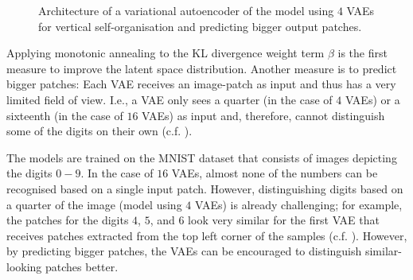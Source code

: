 \begin{figure}[h]
{
}
    \caption[Architecture of the VAEs predicting bigger output patches]{Architecture of a variational autoencoder of the model using $4$ VAEs for vertical self-organisation and predicting bigger output patches.}
\end{figure}
Applying monotonic annealing to the KL divergence weight term $\beta$ is the first measure to improve the latent space distribution.
Another measure is to predict bigger patches:
Each VAE receives an image-patch as input and thus has a very limited field of view. I.e., a VAE only sees a quarter (in the case of $4$ VAEs) or a sixteenth (in the case of $16$ VAEs) as input and, therefore, cannot distinguish some of the digits on their own (c.f. ).

The models are trained on the MNIST dataset \cite{Lecun_Bottou_Bengio_Haffner_1998} that consists of images depicting the digits $0-9$. 
In the case of $16$ VAEs, almost none of the numbers can be recognised based on a single input patch.
However, distinguishing digits based on a quarter of the image (model using $4$ VAEs) is already challenging; for example, the patches for the digits $4$, $5$, and $6$ look very similar for the first VAE that receives patches extracted from the top left corner of the samples (c.f. ).
However, by predicting bigger patches, the VAEs can be encouraged to distinguish similar-looking patches better.

